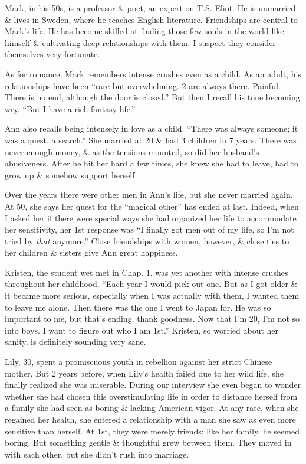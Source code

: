 \documentclass{article}
\numberwithin{equation}{section}
\begin{document}
Mark, in his 50s, is a professor \& poet, an expert on T.S. Eliot. He is unmarried \& lives in Sweden, where he teaches English literature. Friendships are central to Mark's life. He has become skilled at finding those few souls in the world like himself \& cultivating deep relationships with them. I suspect they consider themselves very fortunate.

As for romance, Mark remembers intense crushes even as a child. As an adult, his relationships have been ``rare but overwhelming. 2 are always there. Painful. There is no end, although the door is closed.'' But then I recall his tone becoming wry. ``But I have a rich fantasy life.''

Ann also recalls being intensely in love as a child. ``There was always someone; it was a quest, a search.'' She married at 20 \& had 3 children in 7 years. There was never enough money, \& as the tensions mounted, so did her husband's abusiveness. After he hit her hard a few times, she knew she had to leave, had to grow up \& somehow support herself.

Over the years there were other men in Ann's life, but she never married again. At 50, she says her quest for the ``magical other'' has ended at last. Indeed, when I asked her if there were special ways she had organized her life to accommodate her sensitivity, her 1st response was ``I finally got men out of my life, so I'm not tried by \textit{that} anymore.'' Close friendships with women, however, \& close ties to her children \& sisters give Ann great happiness.

Kristen, the student wet met in Chap. 1, was yet another with intense crushes throughout her childhood. ``Each year I would pick out one. But as I got older \& it became more serious, especially when I was actually with them, I wanted them to leave me alone. Then there was the one I went to Japan for. He was so important to me, but that's ending, thank goodness. Now that I'm 20, I'm not so into boys. I want to figure out who I am 1st.'' Kristen, so worried about her sanity, is definitely sounding very sane.

Lily, 30, spent a promiscuous youth in rebellion against her strict Chinese mother. But 2 years before, when Lily's health failed due to her wild life, she finally realized she was miserable. During our interview she even began to wonder whether she had chosen this overstimulating life in order to distance herself from a family she had seen as boring \& lacking American vigor. At any rate, when she regained her health, she entered a relationship with a man she saw as even more sensitive than herself. At 1st, they were merely friends; like her family, he seemed boring. But something gentle \& thoughtful grew between them. They moved in with each other, but she didn't rush into marriage.
\end{document}
